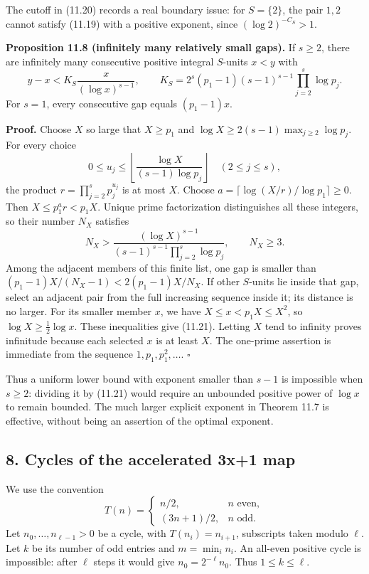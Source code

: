 \documentclass[
  11pt,
  a4paper,
]{article}
\begin{document}
The cutoff in (11.20) records a real boundary issue: for \(S=\{2\}\),
the pair \(1,2\) cannot satisfy (11.19) with a positive exponent, since
\((\log2)^{-C_S}>1\).

\textbf{Proposition 11.8 (infinitely many relatively small gaps).} If
\(s\ge2\), there are infinitely many consecutive positive integral
\(S\)-units \(x<y\) with \[
y-x<K_S\frac{x}{(\log x)^{s-1}},\qquad
K_S=2^s(p_1-1)(s-1)^{s-1}\prod_{j=2}^s\log p_j.
\tag{11.21}
\] For \(s=1\), every consecutive gap equals \((p_1-1)x\).

\textbf{Proof.} Choose \(X\) so large that \(X\ge p_1\) and
\(\log X\ge2(s-1)\max_{j\ge2}\log p_j\). For every choice \[
0\le u_j\le\left\lfloor\frac{\log X}{(s-1)\log p_j}\right\rfloor
\quad(2\le j\le s),
\] the product \(r=\prod_{j=2}^s p_j^{u_j}\) is at most \(X\). Choose
\(a=\lceil\log(X/r)/\log p_1\rceil\ge0\). Then \(X\le p_1^a r<p_1X\).
Unique prime factorization distinguishes all these integers, so their
number \(N_X\) satisfies \[
N_X>\frac{(\log X)^{s-1}}
{(s-1)^{s-1}\prod_{j=2}^s\log p_j},\qquad N_X\ge3.
\] Among the adjacent members of this finite list, one gap is smaller
than \((p_1-1)X/(N_X-1)<2(p_1-1)X/N_X\). If other \(S\)-units lie inside
that gap, select an adjacent pair from the full increasing sequence
inside it; its distance is no larger. For its smaller member \(x\), we
have \(X\le x<p_1X\le X^2\), so \(\log X\ge\tfrac12\log x\). These
inequalities give (11.21). Letting \(X\) tend to infinity proves
infinitude because each selected \(x\) is at least \(X\). The one-prime
assertion is immediate from the sequence \(1,p_1,p_1^2,\ldots\).
\(\square\)

Thus a uniform lower bound with exponent smaller than \(s-1\) is
impossible when \(s\ge2\): dividing it by (11.21) would require an
unbounded positive power of \(\log x\) to remain bounded. The much
larger explicit exponent in Theorem 11.7 is effective, without being an
assertion of the optimal exponent.

\subsection{8. Cycles of the accelerated 3x+1
map}\label{cycles-of-the-accelerated-3x1-map}

We use the convention \[
T(n)=\begin{cases}n/2,&n\text{ even},\\(3n+1)/2,&n\text{ odd}.
\end{cases}
\tag{11.22}
\] Let \(n_0,\ldots,n_{\ell-1}>0\) be a cycle, with \(T(n_i)=n_{i+1}\),
subscripts taken modulo \(\ell\). Let \(k\) be its number of odd entries
and \(m=\min_i n_i\). An all-even positive cycle is impossible: after
\(\ell\) steps it would give \(n_0=2^{-\ell}n_0\). Thus
\(1\le k\le\ell\).
\end{document}
